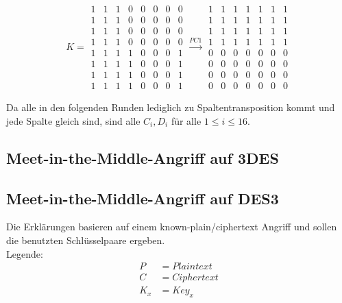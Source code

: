 \begin{equation}
K=\begin{matrix}
1 & 1 & 1 & 0 & 0 & 0 & 0 & 0 \\
1 & 1 & 1 & 0 & 0 & 0 & 0 & 0 \\
1 & 1 & 1 & 0 & 0 & 0 & 0 & 0 \\
1 & 1 & 1 & 0 & 0 & 0 & 0 & 0 \\
1 & 1 & 1 & 1 & 0 & 0 & 0 & 1 \\
1 & 1 & 1 & 1 & 0 & 0 & 0 & 1 \\
1 & 1 & 1 & 1 & 0 & 0 & 0 & 1 \\
1 & 1 & 1 & 1 & 0 & 0 & 0 & 1 
\end{matrix} \xrightarrow{PC1}
\begin{matrix}
1 & 1 & 1 & 1 & 1 & 1 & 1 \\
1 & 1 & 1 & 1 & 1 & 1 & 1 \\
1 & 1 & 1 & 1 & 1 & 1 & 1 \\ 
1 & 1 & 1 & 1 & 1 & 1 & 1 \\ 
0 & 0 & 0 & 0 & 0 & 0 & 0 \\ 
0 & 0 & 0 & 0 & 0 & 0 & 0 \\ 
0 & 0 & 0 & 0 & 0 & 0 & 0 \\ 
0 & 0 & 0 & 0 & 0 & 0 & 0 
\end{matrix}
\end{equation}

Da alle in den folgenden Runden lediglich zu Spaltentransposition kommt und jede Spalte gleich sind, 
sind alle $C_i,D_i$ für alle $1 \le i \le 16$.

\subsection{Meet-in-the-Middle-Angriff auf 3DES}
\subsection{Meet-in-the-Middle-Angriff auf DES3}
 Die Erklärungen basieren auf einem known-plain/ciphertext Angriff und sollen die benutzten Schlüsselpaare ergeben.\\
 Legende:\\
 \begin{align*}
         P &= Plaintext\\
         C &= Ciphertext\\
         K_x &= Key_x
     \end{align*}
